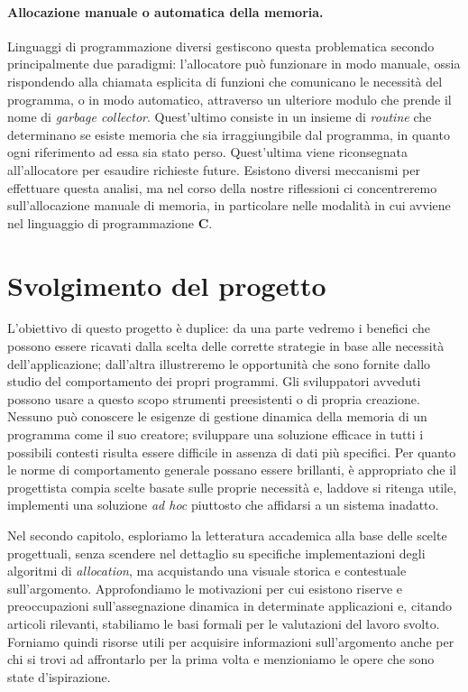 \paragraph{Allocazione manuale o automatica della memoria.}
Linguaggi di programmazione diversi gestiscono questa problematica secondo principalmente due paradigmi: l'allocatore può funzionare in modo manuale, ossia rispondendo alla chiamata esplicita di funzioni che comunicano le necessità del programma, o in modo automatico, attraverso un ulteriore modulo che prende il nome di \textit{garbage collector}. Quest'ultimo consiste in un insieme di \textit{routine} che determinano se esiste memoria che sia irraggiungibile dal programma, in quanto ogni riferimento ad essa sia stato perso. Quest'ultima viene riconsegnata all'allocatore per esaudire richieste future. Esistono diversi meccanismi per effettuare questa analisi, ma nel corso della nostre riflessioni ci concentreremo sull'allocazione manuale di memoria, in particolare nelle modalità in cui avviene nel linguaggio di programmazione \textbf{C}. 

\section{Svolgimento del progetto}
L'obiettivo di questo progetto è duplice: da una parte vedremo i benefici che possono essere ricavati dalla scelta delle corrette strategie in base alle necessità dell'applicazione; dall'altra illustreremo le opportunità che sono fornite dallo studio del comportamento dei propri programmi. Gli sviluppatori avveduti possono usare a questo scopo strumenti preesistenti o di propria creazione. Nessuno può conoscere le esigenze di gestione dinamica della memoria di un programma come il suo creatore; sviluppare una soluzione efficace in tutti i possibili contesti risulta essere difficile in assenza di dati più specifici. Per quanto le norme di comportamento generale possano essere brillanti, è appropriato che il progettista compia scelte basate sulle proprie necessità e, laddove si ritenga utile, implementi una soluzione \textit{ad hoc} piuttosto che affidarsi a un sistema inadatto.

Nel secondo capitolo, esploriamo la letteratura accademica alla base delle scelte progettuali, senza scendere nel dettaglio su specifiche implementazioni degli algoritmi di \textit{allocation}, ma acquistando una visuale storica e contestuale sull'argomento. Approfondiamo le motivazioni per cui esistono riserve e preoccupazioni sull'assegnazione dinamica in determinate applicazioni e, citando articoli rilevanti, stabiliamo le basi formali per le valutazioni del lavoro svolto. Forniamo quindi risorse utili per acquisire informazioni sull'argomento anche per chi si trovi ad affrontarlo per la prima volta e menzioniamo le opere che sono state d'ispirazione. 

